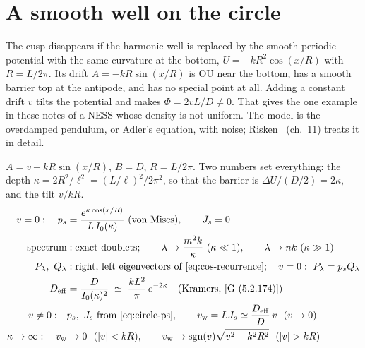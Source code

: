 \documentclass[11pt]{article}
\numberwithin{equation}{section}
\newcommand{\G}[1]{[G~(#1)]}
\begin{document}
\section{A smooth well on the circle}
\label{sec:cos-circle}

The cusp disappears if the harmonic well is replaced by the smooth periodic potential with the same curvature
at the bottom, $U=-kR^2\cos(x/R)$ with $R=L/2\pi$. Its drift $A=-kR\sin(x/R)$ is OU near the bottom, has a
smooth barrier top at the antipode, and has no special point at all. Adding a constant drift $v$ tilts the
potential and makes $\Phi=2vL/D\neq0$. That gives the one example in these notes of a NESS whose density is
not uniform. The model is the overdamped pendulum, or Adler's equation, with noise; Risken~\cite{risken}
(ch.~11) treats it in detail.

\begin{keyresults}
$A=v-kR\sin(x/R)$, $B=D$, $R=L/2\pi$. Two numbers set everything: the depth $\kappa=2R^2/\ell^2=(L/\ell)^2/2\pi^2$,
so that the barrier is $\Delta U/(D/2)=2\kappa$, and the tilt $v/kR$.
\begin{align}
  v=0:\quad p_s &= \frac{e^{\kappa\cos(x/R)}}{L\,I_0(\kappa)}\ \text{(von Mises)},\qquad J_s=0 \\
  \text{spectrum} &: \text{exact doublets};\qquad \lambda\to\frac{m^2k}{\kappa}\ (\kappa\ll1),\qquad
  \lambda\to nk\ (\kappa\gg1) \\
  P_\lambda,\ Q_\lambda &: \text{right, left eigenvectors of \cref{eq:cos-recurrence}};\quad
  v=0:\ P_\lambda=p_sQ_\lambda \\
  D_{\rm eff} &= \frac{D}{I_0(\kappa)^2}\;\simeq\;\frac{kL^2}{\pi}\,e^{-2\kappa}\quad
  \text{(Kramers, \G{5.2.174})} \\
  v\neq0:\quad & p_s,\ J_s\ \text{from \cref{eq:circle-ps}},\qquad v_{\rm w}=LJ_s\simeq\frac{D_{\rm eff}}{D}\,v\ \
  (v\to0) \\
  \kappa\to\infty:\quad v_{\rm w} &\to 0\ \ (|v|<kR),\qquad v_{\rm w}\to\operatorname{sgn}(v)\sqrt{v^2-k^2R^2}\ \ (|v|>kR)
\end{align}
\end{keyresults}
\end{document}
